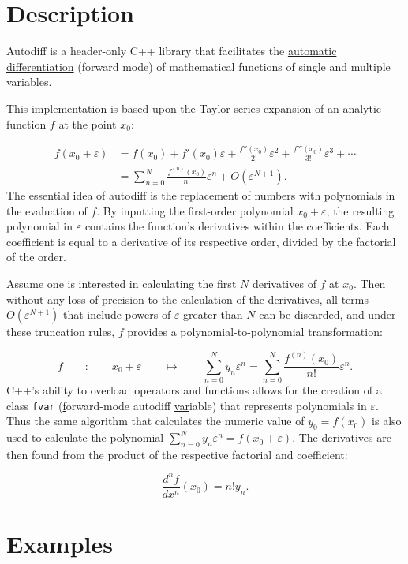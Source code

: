 \documentclass{article}
\begin{document}
\section{Description}

Autodiff is a header-only C++ library that facilitates the
\href{https://en.wikipedia.org/wiki/Automatic_differentiation}{automatic differentiation} (forward mode) of
mathematical functions of single and multiple variables.

This implementation is based upon the \href{https://en.wikipedia.org/wiki/Taylor_series}{Taylor series} expansion of
an analytic function $f$ at the point $x_0$:

\begin{align*}
f(x_0+\varepsilon) &= f(x_0) + f'(x_0)\varepsilon + \frac{f''(x_0)}{2!}\varepsilon^2 + \frac{f'''(x_0)}{3!}\varepsilon^3 + \cdots \\
  &= \sum_{n=0}^N\frac{f^{(n)}(x_0)}{n!}\varepsilon^n + O\left(\varepsilon^{N+1}\right).
\end{align*}
The essential idea of autodiff is the replacement of numbers with polynomials in the evaluation of $f$. By inputting
the first-order polynomial $x_0+\varepsilon$, the resulting polynomial in $\varepsilon$ contains the function's
derivatives within the coefficients. Each coefficient is equal to a derivative of its respective order, divided
by the factorial of the order.

Assume one is interested in calculating the first $N$ derivatives of $f$ at $x_0$. Then without any loss of
precision to the calculation of the derivatives, all terms $O\left(\varepsilon^{N+1}\right)$ that include
powers of $\varepsilon$ greater than $N$ can be discarded, and under these truncation rules, $f$ provides a
polynomial-to-polynomial transformation:

\[
f \qquad : \qquad x_0+\varepsilon \qquad \mapsto \qquad
    \sum_{n=0}^Ny_n\varepsilon^n=\sum_{n=0}^N\frac{f^{(n)}(x_0)}{n!}\varepsilon^n.
\]
C++'s ability to overload operators and functions allows for the creation of a class {\tt fvar}
(\underline{f}orward-mode autodiff \underline{var}iable) that represents polynomials in $\varepsilon$. Thus
the same algorithm that calculates the numeric value of $y_0=f(x_0)$ is also used to calculate the polynomial
$\sum_{n=0}^Ny_n\varepsilon^n=f(x_0+\varepsilon)$. The derivatives are then found from the product of the respective
factorial and coefficient:

\[ \frac{d^nf}{dx^n}(x_0)=n!y_n. \]

\section{Examples}
\end{document}
